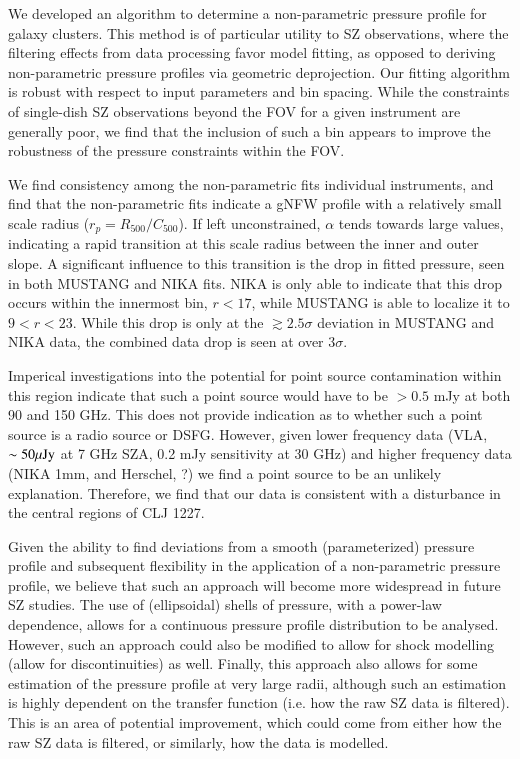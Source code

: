 \documentclass[twocolumn,traditabstract]{aa}
\begin{document}
We developed an algorithm to determine a non-parametric pressure profile for galaxy clusters.
This method is of particular utility to SZ observations, where the filtering effects from data
processing favor model fitting, as opposed to deriving non-parametric pressure profiles via
geometric deprojection. Our fitting algorithm is robust with respect to input parameters and
bin spacing. While the constraints of single-dish SZ observations beyond the FOV for a given
instrument are generally poor, we find that the inclusion of such a bin appears to improve
the robustness of the pressure constraints within the FOV.

We find consistency among the non-parametric fits individual instruments, and find that the
non-parametric fits indicate a gNFW profile with a relatively small scale radius
($r_p = R_{500}/C_{500}$). If left unconstrained, $\alpha$ tends towards large values, indicating
a rapid transition at this scale radius between the inner and outer slope. A significant
influence to this transition is the drop in fitted pressure, seen in both MUSTANG and NIKA
fits. NIKA is only able to indicate that this drop occurs within the innermost bin, $r < 17$\asec,
while MUSTANG is able to localize it to $9 < r < 23$\asec. While this drop is only at the
$\gtrsim 2.5 \sigma$ deviation in MUSTANG and NIKA data, the combined data drop is seen at over
$3 \sigma$.

Imperical investigations into the potential for point source contamination within this region
indicate that such a point source would have to be $> 0.5$ mJy at both 90 and 150 GHz. This does
not provide indication as to whether such a point source is a radio source or DSFG. However,
given lower frequency data (VLA, $\sim 50 {\rm \mu Jy}$ at 7 GHz
SZA, 0.2 mJy sensitivity at 30 GHz) and higher frequency data
(NIKA 1mm, and Herschel, ?) we find a point source to be an unlikely explanation. Therefore,
we find that our data is consistent with a disturbance in the central regions of CLJ 1227.

Given the ability to find deviations from a smooth (parameterized) pressure profile and
subsequent flexibility in the application of a non-parametric pressure profile, we believe that
such an approach will become more widespread in future SZ studies. The use of (ellipsoidal) shells
of pressure, with a power-law dependence, allows for a continuous pressure profile distribution
to be analysed. However, such an approach could also be modified to allow for shock modelling
(allow for discontinuities) as well. Finally, this approach also allows for some estimation of
the pressure profile at very large radii, although such an estimation is highly dependent on the
transfer function (i.e. how the raw SZ data is filtered). This is an area of potential improvement,
which could come from either how the raw SZ data is filtered, or similarly, how the data is modelled.
\end{document}
